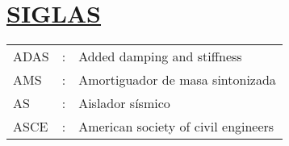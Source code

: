 \section*{\textbf{\underline{SIGLAS}}}

\begin{tabular}{L{1.0 cm}p{0.025 cm}p{11.7 cm}}
ADAS    & : & Added damping and stiffness                                                    \\
AMS     & : & Amortiguador de masa sintonizada                                               \\
AS      & : & Aislador sísmico                                                               \\
ASCE    & : & American society of civil engineers                                            
\end{tabular}\\

